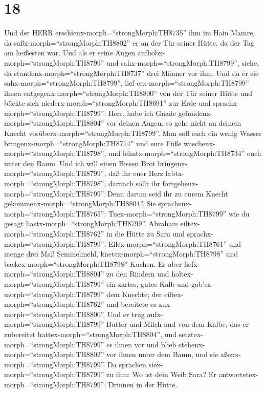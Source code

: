 \hypertarget{section-17}{%
\section{18}\label{section-17}}

 Und der HERR erschienx-morph=``strongMorph:TH8735'' ihm im
Hain Mamre, da saßx-morph=``strongMorph:TH8802'' er an der Tür seiner
Hütte, da der Tag am heißesten war.  Und als er seine Augen
aufhobx-morph=``strongMorph:TH8799'' und
sahx-morph=``strongMorph:TH8799'', siehe, da
standenx-morph=``strongMorph:TH8737'' drei Männer vor ihm. Und da er sie
sahx-morph=``strongMorph:TH8799'', lief erx-morph=``strongMorph:TH8799''
ihnen entgegenx-morph=``strongMorph:TH8800'' von der Tür seiner Hütte
und bückte sich niederx-morph=``strongMorph:TH8691'' zur Erde
 und sprachx-morph=``strongMorph:TH8799'': Herr, habe ich
Gnade gefundenx-morph=``strongMorph:TH8804'' vor deinen Augen, so gehe
nicht an deinem Knecht vorüberx-morph=``strongMorph:TH8799''.
 Man soll euch ein wenig Wasser
bringenx-morph=``strongMorph:TH8714'' und eure Füße
waschenx-morph=``strongMorph:TH8798'', und
lehntx-morph=``strongMorph:TH8734'' euch unter den Baum. 
Und ich will einen Bissen Brot bringenx-morph=``strongMorph:TH8799'',
daß ihr euer Herz labtx-morph=``strongMorph:TH8798''; darnach sollt ihr
fortgehenx-morph=``strongMorph:TH8799''. Denn darum seid ihr zu eurem
Knecht gekommenx-morph=``strongMorph:TH8804''. Sie
sprachenx-morph=``strongMorph:TH8765'':
Tuex-morph=``strongMorph:TH8799'' wie du gesagt
hastx-morph=``strongMorph:TH8799''.  Abraham
eiltex-morph=``strongMorph:TH8762'' in die Hütte zu Sara und
sprachx-morph=``strongMorph:TH8799'': Eilex-morph=``strongMorph:TH8761''
und menge drei Maß Semmelmehl, knetex-morph=``strongMorph:TH8798'' und
backex-morph=``strongMorph:TH8798'' Kuchen.  Er aber
liefx-morph=``strongMorph:TH8804'' zu den Rindern und
holtex-morph=``strongMorph:TH8799'' ein zartes, gutes Kalb und
gab'sx-morph=``strongMorph:TH8799'' dem Knechte; der
eiltex-morph=``strongMorph:TH8762'' und bereitete es
zux-morph=``strongMorph:TH8800''.  Und er trug
aufx-morph=``strongMorph:TH8799'' Butter und Milch und von dem Kalbe,
das er zubereitet hattex-morph=``strongMorph:TH8804'', und
setztex-morph=``strongMorph:TH8799'' es ihnen vor und blieb
stehenx-morph=``strongMorph:TH8802'' vor ihnen unter dem Baum, und sie
aßenx-morph=``strongMorph:TH8799''.  Da sprachen
siex-morph=``strongMorph:TH8799'' zu ihm: Wo ist dein Weib Sara? Er
antwortetex-morph=``strongMorph:TH8799'': Drinnen in der Hütte.
